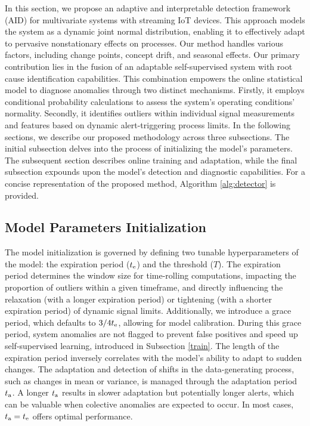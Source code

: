 In this section, we propose an adaptive and interpretable detection framework (AID) for multivariate systems with streaming IoT devices. This approach models the system as a dynamic joint normal distribution, enabling it to effectively adapt to pervasive nonstationary effects on processes. Our method handles various factors, including change points, concept drift, and seasonal effects. Our primary contribution lies in the fusion of an adaptable self-supervised system with root cause identification capabilities. This combination empowers the online statistical model to diagnose anomalies through two distinct mechanisms. Firstly, it employs conditional probability calculations to assess the system's operating conditions' normality. Secondly, it identifies outliers within individual signal measurements and features based on dynamic alert-triggering process limits. In the following sections, we describe our proposed methodology across three subsections. The initial subsection delves into the process of initializing the model's parameters. The subsequent section describes online training and adaptation, while the final subsection expounds upon the model's detection and diagnostic capabilities. For a concise representation of the proposed method, Algorithm \ref{alg:detector} is provided.

\subsection{Model Parameters Initialization}\label{init}
The model initialization is governed by defining two tunable hyperparameters of the model: the expiration period ($t _{\text{e}}$) and the threshold ($T$). The expiration period determines the window size for time-rolling computations, impacting the proportion of outliers within a given timeframe, and directly influencing the relaxation (with a longer expiration period) or tightening (with a shorter expiration period) of dynamic signal limits. Additionally, we introduce a grace period, which defaults to $3/4 t _{\text{e}}$, allowing for model calibration. During this grace period, system anomalies are not flagged to prevent false positives and speed up self-supervised learning, introduced in Subsection \ref{train}. The length of the expiration period inversely correlates with the model's ability to adapt to sudden changes. The adaptation and detection of shifts in the data-generating process, such as changes in mean or variance, is managed through the adaptation period $t _{\text{a}}$. A longer $t _{\text{a}}$ results in slower adaptation but potentially longer alerts, which can be valuable when colective anomalies are expected to occur. In most cases, $t _{\text{a}} = t _{\text{e}}$ offers optimal performance.

